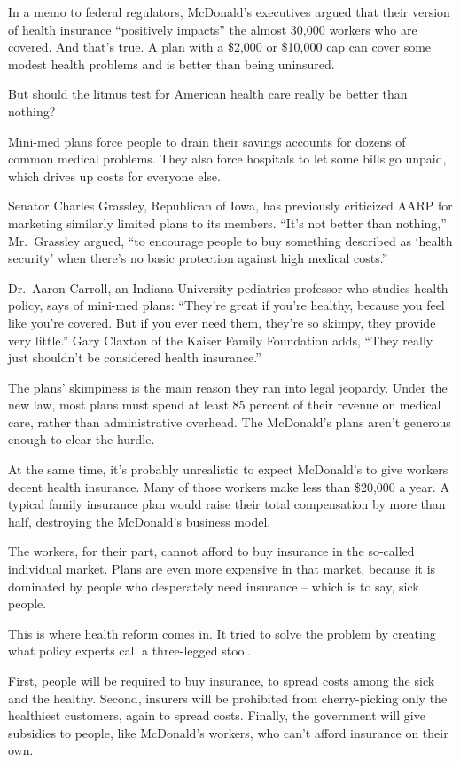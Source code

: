 ﻿\documentclass[12pt]{article}
\begin{document}
In a memo to federal regulators, McDonald's executives argued that their version of health insurance
``positively impacts'' the almost 30,000 workers who are covered. And that's true. A plan with a
\$2,000 or \$10,000 cap can cover some modest health problems and is better than being uninsured.

But should the litmus test for American health care really be better than nothing?

Mini-med plans force people to drain their savings accounts for dozens of common medical problems.
They also force hospitals to let some bills go unpaid, which drives up costs for everyone else.

Senator Charles Grassley, Republican of Iowa, has previously criticized AARP for marketing similarly
limited plans to its members. ``It's not better than nothing,'' Mr.~Grassley argued, ``to encourage
people to buy something described as `health security' when there's no basic protection against high
medical costs.''

Dr.~Aaron Carroll, an Indiana University pediatrics professor who studies health policy, says of
mini-med plans: ``They're great if you're healthy, because you feel like you're covered. But if you
ever need them, they're so skimpy, they provide very little.'' Gary Claxton of the Kaiser Family
Foundation adds, ``They really just shouldn't be considered health insurance.''

The plans' skimpiness is the main reason they ran into legal jeopardy. Under the new law, most plans
must spend at least 85 percent of their revenue on medical care, rather than administrative
overhead. The McDonald's plans aren't generous enough to clear the hurdle.

At the same time, it's probably unrealistic to expect McDonald's to give workers decent health
insurance. Many of those workers make less than \$20,000 a year. A typical family insurance plan
would raise their total compensation by more than half, destroying the McDonald's business model.

The workers, for their part, cannot afford to buy insurance in the so-called individual market.
Plans are even more expensive in that market, because it is dominated by people who desperately need
insurance -- which is to say, sick people.

This is where health reform comes in. It tried to solve the problem by creating what policy experts
call a three-legged stool.

First, people will be required to buy insurance, to spread costs among the sick and the healthy.
Second, insurers will be prohibited from cherry-picking only the healthiest customers, again to
spread costs. Finally, the government will give subsidies to people, like McDonald's workers, who
can't afford insurance on their own.
\end{document}

